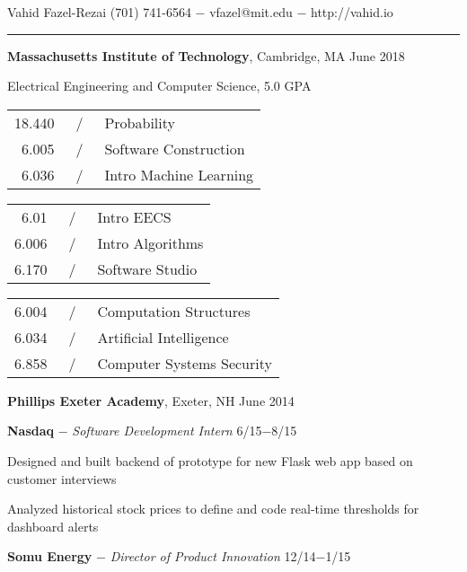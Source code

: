 \documentclass[11pt]{article}
\newcommand{\msection}[1]{\vspace{1em}\marginnote{#1}} %
\newcommand{\bt}[1]{\textbf{#1}} %
\newcommand{\gap}[0]{\vspace{0.5em}} %
\newcommand{\dash}[0]{ $-$ } %
\newcommand{\tabsep}[0]{\, / \,} %
\begin{document}

{\Huge Vahid Fazel-Rezai} \hfill  (701) 741-6564\dash vfazel@mit.edu\dash http://vahid.io

\vspace{0.2em}

\hspace{-1.2in}\rule{7.9in}{0.2em}

\vspace{-0.4em}



\msection{Education}

\bt{Massachusetts Institute of Technology}, Cambridge, MA \hfill June 2018

Electrical Engineering and Computer Science, 5.0 GPA
\vspace{0.15em}

\begin{tabular}{rcl}
18.440 & \tabsep & Probability \\
6.005 & \tabsep & Software Construction \\
6.036 & \tabsep & Intro Machine Learning
\end{tabular}
\hfill
\begin{tabular}{rcl}
6.01 & \tabsep & Intro EECS \\
6.006 & \tabsep & Intro Algorithms \\
6.170 & \tabsep & Software Studio
\end{tabular}
\hfill
\begin{tabular}{rcl}
6.004 & \tabsep & Computation Structures \\
6.034 & \tabsep & Artificial Intelligence \\
6.858 & \tabsep & Computer Systems Security
\end{tabular}

\gap

\bt{Phillips Exeter Academy}, Exeter, NH \hfill June 2014



\msection{Work}

\bt{Nasdaq}\dash \emph{Software Development Intern} \hfill 6/15$-$8/15

Designed and built backend of prototype for new Flask web app based on customer interviews

Analyzed historical stock prices to define and code real-time thresholds for dashboard alerts

\gap

\bt{Somu Energy}\dash \emph{Director of Product Innovation} \hfill 12/14$-$1/15
\end{document}
